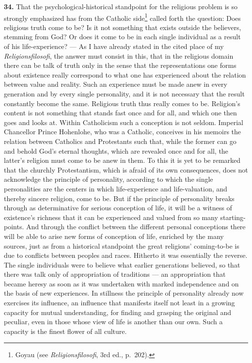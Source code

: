 \documentclass[12pt]{book}
\newcommand{\hnum}[1]{\textbf{#1.}\enspace}
\newcommand{\opage}[1]{\marginnote{\footnotesize\textit{[#1]}}}
\begin{document}
\hnum{34} That the psychological-historical standpoint for the religious problem is so strongly emphasized has
from the Catholic side\footnote{Goyau (see \textit{Religionsfilosofi}, 3rd ed., p.\ 202).} called forth the
question: Does religious truth come to be? Is it not something that exists outside the believers, stemming from
God? Or does it come to be in each single individual as a result of his life-experience? --- As I have already
stated in the cited place of my \textit{Religionsfilosofi}, the answer must consist in this, that in the
religious domain there can be talk of truth only in the sense that the representations one forms about
existence really correspond to what one has experienced about the relation between value and reality. Such an
experience must be made anew in every generation and by every single personality, and it is not necessary that
the result constantly become the same. Religious truth thus really comes to be. Religion's content is not
something that stands fast once and for all, and which one then goes and looks at. Within Catholicism such a
conception is not seldom. Imperial Chancellor Prince Hohenlohe, who was a Catholic, conceives in his memoirs
the relation between Catholics and Protestants such that, while the former can go and behold God's eternal
thoughts, which are revealed once and for all, the latter's religion must come to be anew in them. To this it
is yet to be remarked that the churchly Protestantism, which is afraid of its own consequences, does not
acknowledge the principle of personality, according to which the single personalities are the centers in which
life-experience and life-valuation, and thereby sincere religion, come to be. But if the principle of
personality breaks through as determinative for serious conception of life, \opage{115}it will be a witness of existence's
richness that it can be experienced and valued from so many starting-points. And through the conflict between
the different personal conceptions there will be able to arise new forms of conception of life, enriched by the
many sources, just as from a historical standpoint the great religions' coming-to-be is due to conflicts
between peoples and races. Hitherto it was essentially the reverse. The single individuals were to believe what
earlier generations believed, so that there was talk only of appropriation of traditions --- an appropriation
that became heresy as soon as it was undertaken with marked independence and on the basis of new experiences. In
stillness the principle of personality already now exercises its influence, an influence that manifests itself
not least in a growing capacity for mutual understanding, for finding and grasping the original and
peculiar, even in those whose view of life is another than our own. Such a capacity is the finest flower of all
culture.
\end{document}
